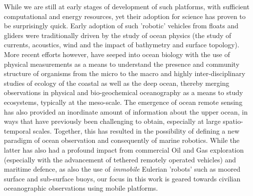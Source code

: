 While we are still at early stages of development of such platforms,
with sufficient computational and energy resources, yet their adoption
for science has proven to be surprisingly quick. Early adoption of
such 'robotic' vehicles from floats and gliders were traditionally
driven by the study of ocean physics (the study of currents,
acoustics, wind and the impact of bathymetry and surface
topology). More recent efforts however, have seeped into ocean biology
with the use of physical measurements as a means to understand the
presence and community structure of organisms from the micro to the
macro and highly inter-disciplinary studies of ecology of the coastal
as well as the deep ocean, thereby merging observations in physical
and bio-geochemical oceanography as a means to study ecosystems,
typically at the meso-scale. The emergence of ocean remote sensing has
also provided an inordinate amount of information about the upper
ocean, in ways that have previously been challenging to obtain,
especially at large spatio-temporal scales. Together, this has
resulted in the possibility of defining a new paradigm of ocean
observation and consequently of marine robotics. While the latter has
also had a profound impact from commercial Oil and Gas exploration
(especially with the advancement of tethered remotely operated
vehicles) and maritime defence, as also the use of \emph{immobile}
Eulerian 'robots' such as moored surface and sub-surface buoys, our
focus in this work is geared towards civilian oceanographic
observations using mobile platforms.


